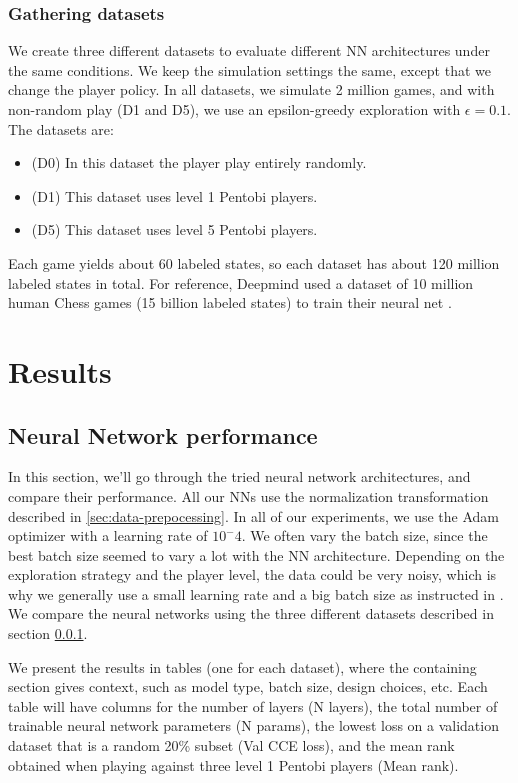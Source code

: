 \documentclass{article}
\begin{document}
\subsubsection{Gathering datasets}
\label{sec:gathering-datasets}
We create three different datasets to evaluate different
NN architectures under the same conditions. We keep the
simulation settings the same, except that we change the
player policy. In all datasets, we simulate 2 million
games, and with non-random play (D1 and D5), we use an
epsilon-greedy exploration with $\epsilon=0.1$.
The datasets are:
\begin{itemize}
    \item (D0) In this dataset the player play entirely randomly.
    \item (D1) This dataset uses level 1 Pentobi players.
    \item (D5) This dataset uses level 5 Pentobi players.
\end{itemize}

\noindent Each game yields about 60 labeled states, so
each dataset has about 120 million labeled states in
total. For reference, Deepmind used a dataset of 10
million human Chess games (15 billion labeled states)
to train their neural net \cite{ruoss2024grandmaster}.

\section{Results}

\subsection{Neural Network performance}
In this section, we'll go through the tried neural
network architectures, and compare their performance.
All our NNs use the normalization transformation
described in \ref{sec:data-prepocessing}. In all
of our experiments, we use the Adam optimizer with
a learning rate of $10^-4$. We often vary the batch
size, since the best batch size seemed to vary a lot
with the NN architecture. Depending on the exploration
strategy and the player level, the data could be very
noisy, which is why we generally use a small learning
rate and a big batch size as instructed in \cite{rolnick2017deep}.
We compare the neural networks using the three different
datasets described in section \ref{sec:gathering-datasets}.

We present the results in tables (one for each dataset),
where the containing section gives context, such as model
type, batch size, design choices, etc. Each table will
have columns for the number of layers (N layers), the
total number of trainable neural network parameters (N params),
the lowest loss on a validation dataset that is a random
20\% subset (Val CCE loss), and the mean rank obtained
when playing against three level 1 Pentobi players (Mean rank).
\end{document}
